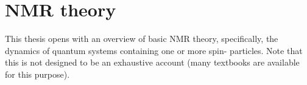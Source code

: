 \chapter{NMR theory}
\label{chpt:theory}

This thesis opens with an overview of basic NMR theory, specifically, the dynamics of quantum systems containing one or more spin-\half{} particles.
Note that this is not designed to be an exhaustive account (many textbooks are available for this purpose).






\printbibliography[heading=subbibnumbered]{}

